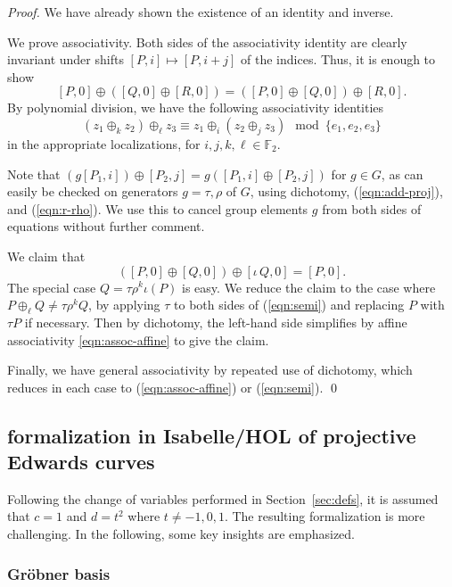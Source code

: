 \documentclass{llncs}
\newcommand{\ring}[1]{\mathbb{#1}}
\begin{document}
\begin{proof} We have already shown the existence of an identity and
  inverse.

  We prove associativity.  Both sides of the associativity identity
  are clearly invariant under shifts $[P,i]\mapsto [P,i+j]$ of the
  indices.  Thus, it is enough to show
\[
[P,0] \oplus ([Q,0]\oplus [R,0]) = ([P,0]\oplus [Q,0])\oplus [R,0].
\]
By polynomial division, we have the following associativity identities
\begin{equation}\label{eqn:assoc-affine}
 (z_1\oplus_k z_2)\oplus_\ell z_3 \equiv z_1 
\oplus_i (z_2\oplus_j z_3) \mod \{e_1,e_2,e_3\}
\end{equation}
in the appropriate localizations, for $i,j,k,\ell\in \ring{F}_2$.

Note that $(g [P_1,i])\oplus [P_2,j] = g([P_1,i]\oplus [P_2,j])$ for
$g\in G$, as can easily be checked on generators $g=\tau,\rho$ of $G$,
using dichotomy, (\ref{eqn:add-proj}), and (\ref{eqn:r-rho}).  We use
this to cancel group elements $g$ from both sides of equations without
further comment.

We claim that
\begin{equation}\label{eqn:semi}
([P,0]\oplus [Q,0])\oplus [\iota\,Q,0] = [P,0].
\end{equation}
The special case $Q= \tau\rho^k \iota(P)$ is easy. We reduce the claim
to the case where $P\oplus_\ell Q\ne \tau\rho^k Q$, by applying $\tau$
to both sides of (\ref{eqn:semi}) and replacing $P$ with $\tau P$ if
necessary.  Then by dichotomy, the left-hand side simplifies by affine
associativity \ref{eqn:assoc-affine} to give the claim.

Finally, we have general associativity by repeated use of dichotomy,
which reduces in each case to (\ref{eqn:assoc-affine}) or
(\ref{eqn:semi}).
\qed\end{proof}

\subsection{formalization in Isabelle/HOL of projective Edwards curves}

Following the change of variables performed in Section~\ref{sec:defs}, 
it is assumed that $c = 1$ and $d = t^2$ where
$t \neq -1,0,1$. The resulting formalization is more challenging. In the
following, some key insights are emphasized.

\subsubsection{Gr\"{o}bner basis}
\end{document}
